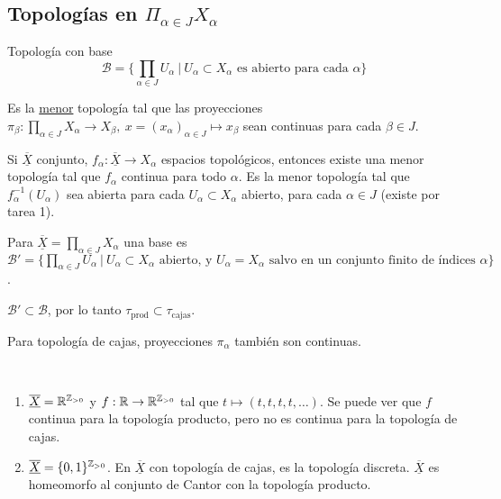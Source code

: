 \subsection{Topologías en $\Pi_{\alpha\in J} X_{\alpha}$}

\begin{definition}
	Topología con base 
	\[ \mathcal{B} = \{ \prod_{\alpha\in J} U_{\alpha} \ | \ U_{\alpha} \subset X_{\alpha} \text{ es abierto para cada } \alpha \} \]
\end{definition}

\begin{definition}
	Es la \underline{menor} topología tal que las proyecciones $\pi_{\beta}: \prod_{\alpha \in J} X_{\alpha} \to X_{\beta},\ x=(x_{\alpha})_{\alpha\in J} \mapsto x_{\beta}$ sean continuas para cada $\beta \in J$.
\end{definition}

\begin{remark}
	Si $\underline{\overline{X}}$ conjunto, $f_{\alpha} : \underline{\overline{X}} \to X_{\alpha}$ espacios topológicos, entonces existe una menor topología tal que $f_{\alpha}$ continua para todo $\alpha$. Es la menor topología tal que $f_{\alpha}^{-1}(U_{\alpha})$ sea abierta para cada $U_{\alpha} \subset X_{\alpha}$ abierto, para cada $\alpha \in J$ (existe por tarea 1).
\end{remark}

\begin{remark}
	Para $\underline{\overline{X}} = \prod_{\alpha \in J} X_{\alpha}$ una base es $\mathcal{B}' = \{ \prod_{\alpha\in J} U_{\alpha} \ | \ U_{\alpha} \subset X_{\alpha} \text{ abierto, y } U_{\alpha} = X_{\alpha} \text{ salvo en un conjunto finito de índices } \alpha \}$.
\end{remark}

\begin{corollary}
	$\mathcal{B}' \subset \mathcal{B}$, por lo tanto $\tau_{\text{prod}} \subset \tau_{\text{cajas}}$.
\end{corollary}

\begin{corollary}
	Para topología de cajas, proyecciones $\pi_{\alpha}$ también son continuas.
\end{corollary}

\begin{eg}~
	\begin{enumerate}
		\item $\underline{\overline{X}} = \mathbb{R}^{\mathbb{Z}_{>0}}$ y $f : \mathbb{R} \to \mathbb{R}^{\mathbb{Z}_{>0}}$ tal que $t \mapsto (t,t,t,t,\dots)$. Se puede ver que $f$ continua para la topología producto, pero no es continua para la topología de cajas.

		\item $\underline{\overline{X}} = \{ 0,1 \}^{\mathbb{Z}_{>0}}$. En $\underline{\overline{X}}$ con topología de cajas, es la topología discreta. $\underline{\overline{X}}$ es homeomorfo al conjunto de Cantor con la topología producto.  
	\end{enumerate}
\end{eg}
